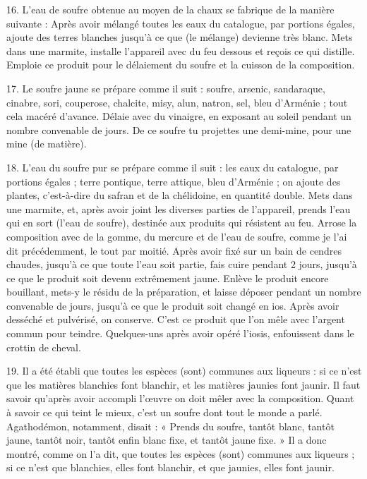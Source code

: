 \documentclass[landscape, a4paper, 11pt, oneside, polutonikogreek, french]{article}
\begin{document}
16. L'eau de soufre obtenue au moyen de la chaux se fabrique de la manière suivante : Après avoir mélangé toutes les eaux du catalogue, par portions égales, ajoute des terres blanches jusqu'à ce que (le mélange) devienne très blanc. Mets dans une marmite, installe l'appareil avec du feu dessous et reçois ce qui distille. Emploie ce produit pour le délaiement du soufre et la cuisson de la composition.

17. Le soufre jaune se prépare comme il suit : soufre, arsenic, sandaraque, cinabre, sori, couperose, chalcite, misy, alun, natron, sel, bleu d'Arménie ; tout cela macéré d'avance. Délaie avec du vinaigre, en exposant au soleil pendant un nombre convenable de jours. De ce soufre tu projettes une demi-mine, pour une mine (de matière).

18. L'eau du soufre pur se prépare comme il suit : les eaux du catalogue, par portions égales ; terre pontique, terre attique, bleu d'Arménie ; on ajoute des plantes, c'est-à-dire du safran et de la chélidoine, en quantité double. Mets dans une marmite, et, après avoir joint les diverses parties de l'appareil, prends l'eau qui en sort (l'eau de soufre), destinée aux produits qui résistent au feu. Arrose la composition avec de la gomme, du mercure et de l'eau de soufre, comme je l'ai dit précédemment, le tout par moitié. Après avoir fixé sur un bain de cendres chaudes, jusqu'à ce que toute l'eau soit partie, fais cuire pendant 2 jours, jusqu'à ce que le produit soit devenu extrêmement jaune. Enlève le produit encore bouillant, mets-y le résidu de la préparation, et laisse déposer pendant un nombre convenable de jours, jusqu'à ce que le produit soit changé en ios. Après avoir desséché et pulvérisé, on conserve. C'est ce produit que l'on mêle avec l'argent commun pour teindre. Quelques-uns après avoir opéré l'iosis, enfouissent dans le crottin de cheval.

19. Il a été établi que toutes les espèces (sont) communes aux liqueurs : si ce n'est que les matières blanchies font blanchir, et les matières jaunies font jaunir. Il faut savoir qu'après avoir accompli l'œuvre on doit mêler avec la composition. Quant à savoir ce qui teint le mieux, c'est un soufre dont tout le monde a parlé. Agathodémon, notamment, disait : « Prends du soufre, tantôt blanc, tantôt jaune, tantôt noir, tantôt enfin blanc fixe, et tantôt jaune fixe. » Il a donc montré, comme on l'a dit, que toutes les espèces (sont) communes aux liqueurs ; si ce n'est que blanchies, elles font blanchir, et que jaunies, elles font jaunir.
\end{document}

